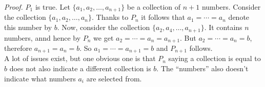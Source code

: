 \documentclass[]{article}
\begin{document}
\textit{Proof.} $P_1$ is true. Let $\{a_1,a_2,\dots,a_{n+1}\}$ be a collection of 
$n+1$ numbers. Consider the collection $\{a_1,a_2,\dots,a_n\}$. Thanks to $P_n$ 
it follows that $a_1 = \cdots = a_n$ denote this number by $b$. 
Now, consider the collection $\{a_2,a_4,\dots,a_{n+1}\}$.
It contains $n$ numbers, annd hence by $P_n$ we get $a_2 = \cdots = a_n = a_{n+1}$.
But $a_2 = \cdots = a_n = b$, therefore $a_{n+1} = a_n = b$. 
So $a_1 = \cdots = a_{n+1} = b$ and $P_{n+1}$ follows.\\

A lot of issues exist, but one obvious one is that $P_n$ saying a collection 
is equal to $b$ does not also indicate a different collection is $b$. 
The ``numbers'' also doesn't indicate what numbers $a_i$ are selected from.
\end{document}

